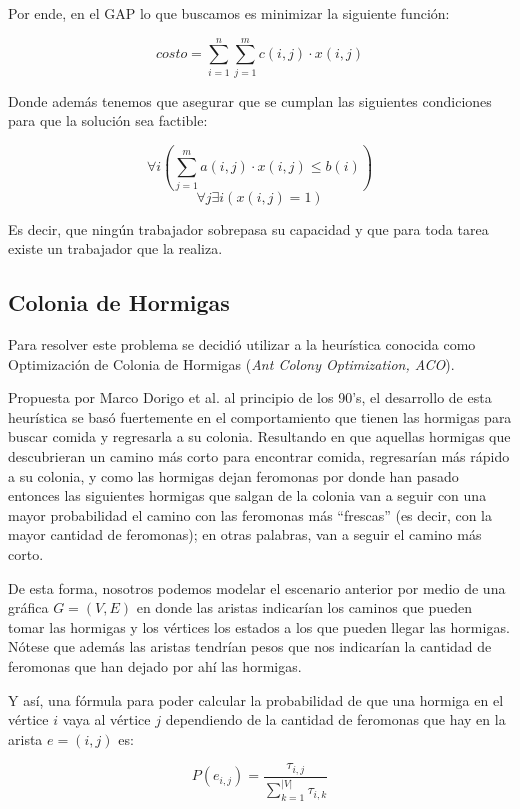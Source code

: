 \documentclass{article}
\newcommand{\tit}[1]{\textit{#1}}
\begin{document}
    Por ende, en el GAP lo que buscamos es minimizar la siguiente
    función:

    \[ costo = \sum_{i = 1}^n \sum_{j = 1}^m c(i, j) \cdot x(i, j) \]

    Donde además tenemos que asegurar que se cumplan las siguientes 
    condiciones para que la solución sea factible:

    \[ \forall i ( \sum_{j = 1}^m a(i, j) \cdot x(i, j) \leq b(i) ) \]
    \[ \forall j \exists i (x(i, j) = 1) \]

    Es decir, que ningún trabajador sobrepasa su capacidad y que 
    para toda tarea existe un trabajador que la realiza.

    \subsection{Colonia de Hormigas} \label{ACO}
    Para resolver este problema se decidió utilizar a la heurística
    conocida como Optimización de Colonia de Hormigas (\tit{Ant Colony
    Optimization, ACO}). 

    Propuesta por Marco Dorigo et al. al principio de los 90's, el 
    desarrollo de esta heurística se basó fuertemente  en el 
    comportamiento que tienen las hormigas para buscar comida y 
    regresarla a su colonia. Resultando en que aquellas hormigas que
    descubrieran un camino más corto para encontrar comida, regresarían 
    más rápido a su colonia, y como las hormigas dejan feromonas por 
    donde han pasado entonces las siguientes hormigas que salgan de 
    la colonia van a seguir con una mayor probabilidad el camino con 
    las feromonas más ``frescas'' (es decir, con la mayor cantidad de 
    feromonas); en otras palabras, van a seguir el camino más corto.

    De esta forma, nosotros podemos modelar el escenario anterior 
    por medio de una gráfica $G = (V, E)$ en donde las aristas 
    indicarían los caminos que pueden tomar las hormigas y los 
    vértices los estados a los que pueden llegar las hormigas. 
    Nótese que además las aristas tendrían pesos que nos indicarían
    la cantidad de feromonas que han dejado por ahí las hormigas.

    Y así, una fórmula para poder calcular la probabilidad de que 
    una hormiga en el vértice $i$ vaya al vértice $j$ dependiendo 
    de la cantidad de feromonas que hay en la arista $e = (i, j)$ 
    es:

    \begin{equation} \label{prob}
      P(e_{i, j}) = \frac{ \tau_{i,j} } { \sum_{k = 1}^{|V|} \tau_{i, k} }
    \end{equation}
\end{document}
